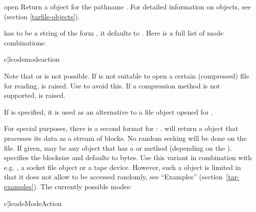 \begin{funcdesc}{open}{}
    Return a  object for the pathname .
    For detailed information on  objects,
    see  (section \ref{tarfile-objects}).

     has to be a string of the form ,
    it defaults to . Here is a full list of mode combinations:

    \begin{tableii}{c|l}{code}{mode}{action}
    \end{tableii}

    Note that  or  is not possible.
    If  is not suitable to open a certain (compressed) file for
    reading,  is raised. Use   to
    avoid this.  If a compression method is not supported,
     is raised.

    If  is specified, it is used as an alternative to
    a file object opened for .

    For special purposes, there is a second format for :
    .   will return a
     object that processes its data as a stream of
    blocks.  No random seeking will be done on the file. If given,
     may be any object that has a  or
     method (depending on the ).
     specifies the blocksize and defaults to  bytes. Use this variant in combination with
    e.g. , a socket file object or a tape device.
    However, such a  object is limited in that it does
    not allow to be accessed randomly, see ``Examples''
    (section~\ref{tar-examples}).  The currently possible modes:

    \begin{tableii}{c|l}{code}{Mode}{Action}
    \end{tableii}
\end{funcdesc}

